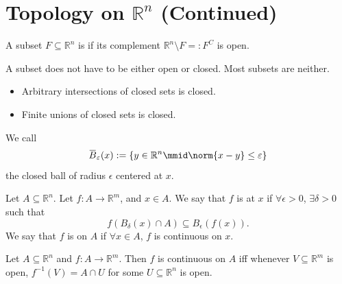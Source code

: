 \documentclass[notoc,notitlepage]{tufte-book}
\begin{document}
\section{Topology on \texorpdfstring{$\mathbb{R}^n$}{Rn} (Continued)}%
\label{sec:topology_on_r_n_continued}

\begin{defn}[Closed]\label{defn:closed}
  A subset $F \subseteq \mathbb{R}^n$ is  if its complement
  $\mathbb{R}^n \setminus F =: F^C$ is open.
\end{defn}

\begin{warning}
  A subset does not have to be either open or closed. Most subsets are neither.
\end{warning}

\begin{note}
  \begin{itemize}
    \item Arbitrary intersections of closed sets is closed.
    \item Finite unions of closed sets is closed.
  \end{itemize}
\end{note}

\begin{note}[Notation]
  We call
  \begin{equation*}
    \bar{B}_{\epsilon}(x) := \left\{ y \in \mathbb{R}^n \mmid \norm{ x - y } \leq \epsilon \right\}
  \end{equation*}
  the closed ball of radius $\epsilon$ centered at $x$.
\end{note}

\begin{defn}[Continuity]\label{defn:continuity}
  Let $A \subseteq \mathbb{R}^n$. Let $f : A \to \mathbb{R}^m$, and $x \in A$. We say
  that $f$ is  at $x$ if $\forall \epsilon > 0$, $\exists \delta
  > 0$ such that
  \begin{equation*}
    f(B_{\delta}(x) \cap A) \subseteq B_{\epsilon}(f(x)).
  \end{equation*}
  We say that $f$ is  on $A$ if $\forall x \in A$, $f$ is continuous
  on $x$.
\end{defn}

\begin{propo}\label{propo:inverse_of_a_continuous_map_is_open}
  Let $A \subseteq \mathbb{R}^n$ and $f : A \to \mathbb{R}^m$. Then $f$ is continuous on
  $A$ iff whenever $V \subseteq \mathbb{R}^m$ is open, $f^{-1}(V) = A \cap U$ for some
  $U \subseteq \mathbb{R}^n$ is open.
\end{propo}
\end{document}
